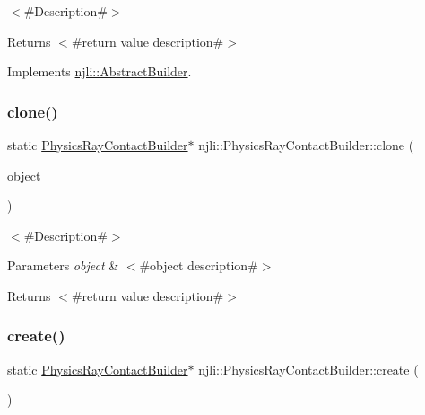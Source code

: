 $<$\#\+Description\#$>$

\begin{DoxyReturn}{Returns}
$<$\#return value description\#$>$ 
\end{DoxyReturn}


Implements \mbox{\hyperlink{classnjli_1_1_abstract_builder_aa1d220053e182c37b31b427499c6eacf}{njli\+::\+Abstract\+Builder}}.

\mbox{\label{classnjli_1_1_physics_ray_contact_builder_afb36a78aa3fea0526e46c44e7eca0e42}} 
\subsubsection{\texorpdfstring{clone()}{clone()}}
{\footnotesize\ttfamily static \mbox{\hyperlink{classnjli_1_1_physics_ray_contact_builder}{Physics\+Ray\+Contact\+Builder}}$\ast$ njli\+::\+Physics\+Ray\+Contact\+Builder\+::clone (\begin{DoxyParamCaption}\item[{const \mbox{\hyperlink{classnjli_1_1_physics_ray_contact_builder}{Physics\+Ray\+Contact\+Builder}} \&}]{object }\end{DoxyParamCaption})\hspace{0.3cm}{\ttfamily [static]}}

$<$\#\+Description\#$>$


\begin{DoxyParams}{Parameters}
{\em object} & $<$\#object description\#$>$\\
\hline
\end{DoxyParams}
\begin{DoxyReturn}{Returns}
$<$\#return value description\#$>$ 
\end{DoxyReturn}
\mbox{\label{classnjli_1_1_physics_ray_contact_builder_aaee5c3ad4954040fedd568fd118e553e}} 
\subsubsection{\texorpdfstring{create()}{create()}}
{\footnotesize\ttfamily static \mbox{\hyperlink{classnjli_1_1_physics_ray_contact_builder}{Physics\+Ray\+Contact\+Builder}}$\ast$ njli\+::\+Physics\+Ray\+Contact\+Builder\+::create (\begin{DoxyParamCaption}{ }\end{DoxyParamCaption})\hspace{0.3cm}{\ttfamily [static]}}

